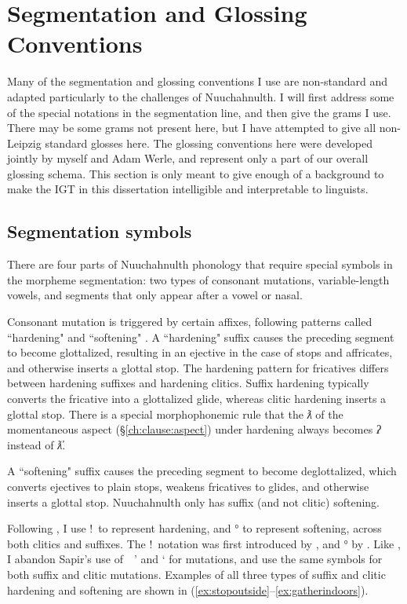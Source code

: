 \chapter{Segmentation and Glossing Conventions} \label{appendix:glossing}

Many of the segmentation and glossing conventions I use are non-standard and adapted particularly to the challenges of Nuuchahnulth. I will first address some of the special notations in the segmentation line, and then give the grams I use. There may be some grams not present here, but I have attempted to give all non-Leipzig standard \citep{leipzig} glosses here. The glossing conventions here were developed jointly by myself and Adam Werle, and represent only a part of our overall glossing schema. This section is only meant to give enough of a background to make the IGT in this dissertation intelligible and interpretable to linguists.

\section{Segmentation symbols}

There are four parts of Nuuchahnulth phonology that require special symbols in the morpheme segmentation: two types of consonant mutations, variable-length vowels, and segments that only appear after a vowel or nasal.

Consonant mutation is triggered by certain affixes, following patterns called ``hardening" and ``softening" \citep{werle2010}. A ``hardening" suffix causes the preceding segment to become glottalized, resulting in an ejective in the case of stops and affricates, and otherwise inserts a glottal stop. The hardening pattern for fricatives differs between hardening suffixes and hardening clitics. Suffix hardening typically converts the fricative into a glottalized glide, whereas clitic hardening inserts a glottal stop. There is a special morphophonemic rule that the \textit{ƛ} of the momentaneous aspect (\S\ref{ch:clause:aspect}) under hardening always becomes \textit{ʔ} instead of \textit{ƛ̓}.

A ``softening" suffix causes the preceding segment to become deglottalized, which converts ejectives to plain stops, weakens fricatives to glides, and otherwise inserts a glottal stop. Nuuchahnulth only has suffix (and not clitic) softening.

Following \cite{werle2010}, I use !\ to represent hardening, and ° to represent softening, across both clitics and suffixes. The !\ notation was first introduced by \cite{boas1947}, and ° by \cite{jacobsen1996}. Like \citeauthor{werle2010}, I abandon Sapir's use of\ \ ' and ` for mutations, and use the same symbols for both suffix and clitic mutations. Examples of all three types of suffix and clitic hardening and softening are shown in (\ref{ex:stopoutside}--\ref{ex:gatherindoors}).

